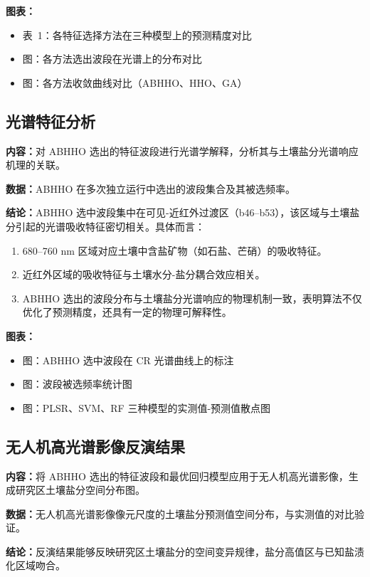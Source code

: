 \documentclass[12pt,a4paper]{article}
\begin{document}
\textbf{图表：}
\begin{itemize}
    \item 表~1：各特征选择方法在三种模型上的预测精度对比
    \item 图：各方法选出波段在光谱上的分布对比
    \item 图：各方法收敛曲线对比（ABHHO、HHO、GA）
\end{itemize}

\subsection{光谱特征分析}

\textbf{内容：}对 ABHHO 选出的特征波段进行光谱学解释，分析其与土壤盐分光谱响应机理的关联。

\textbf{数据：}ABHHO 在多次独立运行中选出的波段集合及其被选频率。

\textbf{结论：}ABHHO 选中波段集中在可见-近红外过渡区（b46--b53），该区域与土壤盐分引起的光谱吸收特征密切相关。具体而言：
\begin{enumerate}
    \item 680--760 nm 区域对应土壤中含盐矿物（如石盐、芒硝）的吸收特征。
    \item 近红外区域的吸收特征与土壤水分-盐分耦合效应相关。
    \item ABHHO 选出的波段分布与土壤盐分光谱响应的物理机制一致，表明算法不仅优化了预测精度，还具有一定的物理可解释性。
\end{enumerate}

\textbf{图表：}
\begin{itemize}
    \item 图：ABHHO 选中波段在 CR 光谱曲线上的标注
    \item 图：波段被选频率统计图
    \item 图：PLSR、SVM、RF 三种模型的实测值-预测值散点图
\end{itemize}

\subsection{无人机高光谱影像反演结果}

\textbf{内容：}将 ABHHO 选出的特征波段和最优回归模型应用于无人机高光谱影像，生成研究区土壤盐分空间分布图。

\textbf{数据：}无人机高光谱影像像元尺度的土壤盐分预测值空间分布，与实测值的对比验证。

\textbf{结论：}反演结果能够反映研究区土壤盐分的空间变异规律，盐分高值区与已知盐渍化区域吻合。
\end{document}
